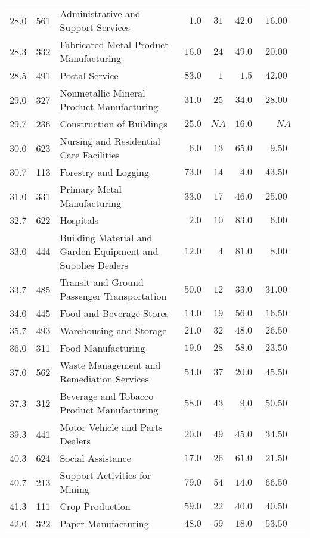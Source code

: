 \documentclass[9pt, oneside]{article}   	%
\begin{document}
\begin{longtable}{lcp{3 in}ccccc}
28.0  & 561 & Administrative and Support Services & $\phantom{0}1.0$ & $31$ & $42.0$ & $16.00$ \\
28.3  & 332 & Fabricated Metal Product Manufacturing & $16.0$ & $24$ & $49.0$ & $20.00$ \\
28.5  & 491 & Postal Service & $83.0$ & $\phantom{0}1$ & $\phantom{0}1.5$ & $42.00$ \\
29.0  & 327 & Nonmetallic Mineral Product Manufacturing & $31.0$ & $25$ & $34.0$ & $28.00$ \\
29.7  & 236 & Construction of Buildings & $25.0$ & $NA$ & $16.0$ & $\phantom{000}NA$ \\
30.0  & 623 & Nursing and Residential Care Facilities & $\phantom{0}6.0$ & $13$ & $65.0$ & $\phantom{0}9.50$ \\
30.7  & 113 & Forestry and Logging & $73.0$ & $14$ & $\phantom{0}4.0$ & $43.50$ \\
31.0  & 331 & Primary Metal Manufacturing & $33.0$ & $17$ & $46.0$ & $25.00$ \\
32.7  & 622 & Hospitals & $\phantom{0}2.0$ & $10$ & $83.0$ & $\phantom{0}6.00$ \\
33.0  & 444 & Building Material and Garden Equipment and Supplies Dealers & $12.0$ & $\phantom{0}4$ & $81.0$ & $\phantom{0}8.00$ \\
33.7  & 485 & Transit and Ground Passenger Transportation & $50.0$ & $12$ & $33.0$ & $31.00$ \\
34.0  & 445 & Food and Beverage Stores & $14.0$ & $19$ & $56.0$ & $16.50$ \\
35.7  & 493 & Warehousing and Storage & $21.0$ & $32$ & $48.0$ & $26.50$ \\
36.0  & 311 & Food Manufacturing & $19.0$ & $28$ & $58.0$ & $23.50$ \\
37.0  & 562 & Waste Management and Remediation Services & $54.0$ & $37$ & $20.0$ & $45.50$ \\
37.3  & 312 & Beverage and Tobacco Product Manufacturing & $58.0$ & $43$ & $\phantom{0}9.0$ & $50.50$ \\
39.3  & 441 & Motor Vehicle and Parts Dealers & $20.0$ & $49$ & $45.0$ & $34.50$ \\
40.3  & 624 & Social Assistance & $17.0$ & $26$ & $61.0$ & $21.50$ \\
40.7  & 213 & Support Activities for Mining & $79.0$ & $54$ & $14.0$ & $66.50$ \\
41.3  & 111 & Crop Production & $59.0$ & $22$ & $40.0$ & $40.50$ \\
42.0  & 322 & Paper Manufacturing & $48.0$ & $59$ & $18.0$ & $53.50$ \\

\end{longtable}
\end{document}
